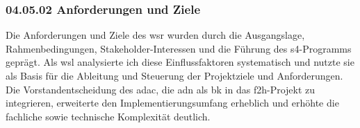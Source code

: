 \subsubsection*{04.05.02 Anforderungen und Ziele} 
\label{sec:04.05.02.AnforderungenUndZiele}

\par Die Anforderungen und Ziele des \gls{wsr} wurden durch die Ausgangslage, Rahmenbedingungen, Stakeholder-Interessen und die Führung des \gls{s4}-Programms geprägt. Als \gls{wsl} analysierte ich diese Einflussfaktoren systematisch und nutzte sie als Basis für die Ableitung und Steuerung der Projektziele und Anforderungen. Die Vorstandentscheidung des \gls{adac}, die \gls{adn} als \gls{bk} in das \gls{f2h}-Projekt zu integrieren, erweiterte den Implementierungsumfang erheblich und erhöhte die fachliche sowie technische Komplexität deutlich.